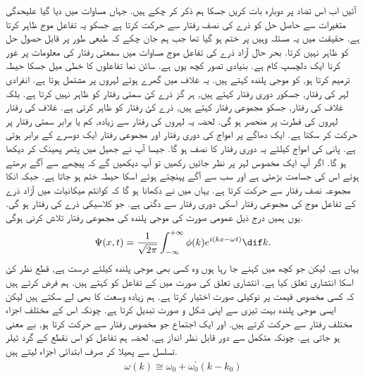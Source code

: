آئیں اب اس تضاد پر دوبارہ بات کریں جسکا ہم ذکر کر چکے ہیں. جہاں مساوات  میں دیا گیا علیحدگی متغیرات سے حاصل حل  کو ذرے کی نصف رفتار سے حرکت کرتا ہے جسکو یہ تفاعل موج ظاہر کرتا ہے. حقیقت میں یہ مسئلہ وہیں پر ختم ہو گیا تھا جب ہم جان چکے کہ  طبعی طور پر قابل حصول حل کو ظاہر نہیں کرتا. بحر حال آزاد ذرے کی تفاعل موج مساوات  میں سمعتی رفتار کی معلومات پر غور کرنا ایک دلچسپ کام ہے. بنیادی تصور کچھ یوں ہے. سائن نما تفاعلوں کا خطی میل جسکا حیطہ  ترمیم کرتا ہو,  کو موجی پلندہ کہتے ہیں. یہ غلاف میں گھرے ہوئے لہروں پر مشتمل ہوتا ہے. انفرادی لہر کی رفتار, جسکور دوری رفتار کہتے ہیں, ہر گز ذرے کئ سمتی رفتار کو ظاہر نہیں کرتا ہے. بلکہ غلاف کی رفتار, جسکو مجموعی رفتار کہتے ہیں, ذرے کئ رفتار کو ظاہر کرتی ہے. غلاف کی رفتار لہروں کی فطرت پر منحصر ہو گی. لحضہ یہ لہروں کی رفتار سے زیادہ, کم یا برابر سمتی رفتار پر حرکت کر سکتا ہے. ایک دھاگے پر امواج کی دوری رفتار اور مجموعی رفتار ایک دوسرے کے برابر ہوتی ہے. پانی کی امواج کیلئے یہ دوری رفتار کا نصف ہو گا. جیسا آپ نے جھیل میں پتھر پھینک کر دیکھا ہو گا. اگر آپ ایک مخصوس لہر پر نظر جائیں رکھیں تو آپ دیکھیں گے کہ پیچھے سے آگے برھتے ہوئے اس کی جسامت بڑھتی ہے اور سب سے آگے پہنچتے ہوئے اسکا حیطہ ختم ہو جاتا ہے. جبکہ انکا مجموعہ نصف رفتار سے حرکت کرتا ہے. یہاں میں نے دکھانا ہو گا کہ کوانٹم میکانیات میں آزاد ذرے کے تفاعل موج کی مجموعی رفتار اسکی دوری رفتار سے دگنی ہے. جو کلاسیکی ذرے کی رفتار ہو گی. یوں ہمیں درج ذیل عمومی صورت کی موجی پلندہ کی مجموعی رفتار تلاش کرنی ہوگی. 
\begin{align*}
\Psi (x,t) = \frac{1}{\sqrt{2\pi}} \int_{- \infty}^{+ \infty} \phi (k) e^{i(kx - \omega t)} \dif k.
\end{align*}
 یہاں  ہے, لیکن جو کچھ میں کہنے جا رہا ہوں وہ کسی بھی موجی پلندہ کیلئے درست ہے, قطع نظر کئ اسکا انتشاری تعلق کیا ہے. انتشاری تعلق  کی صورت میں  کے تفاعل کو کہتے ہیں. ہم فرض کرتے ہیں کہ کسی مخصوص قیمت  پر   نوکیلی صورت اختیار کرتا ہے. ہم زیادہ وسعت کا  بھی لے سکتے ہیں لیکن ایسی موجی پلندہ بہت تیزی سے اپنی شکل و صورت تبدیل کرتا ہے. چونکہ اس کے مختلف اجزاء مختلف رفتار سے حرکت کرتے ہیں. اور ایک اجتماع جو مخصوص رفتار سے حرکت کرتا ہو, بے معنی ہو جاتی ہے. چونکہ متکمل  سے دور قابل نظر انداز ہے, لحضہ ہم تفاعل  کو اس نقطع کے گرد ٹیلر تسلسل سے پھیلا کر صرف ابتدائی اجزاء لیتے ہیں. 
\begin{align*}
\omega (k) \cong \omega_{0} + \omega_{0}^{'} (k-k_{0})
\end{align*}
